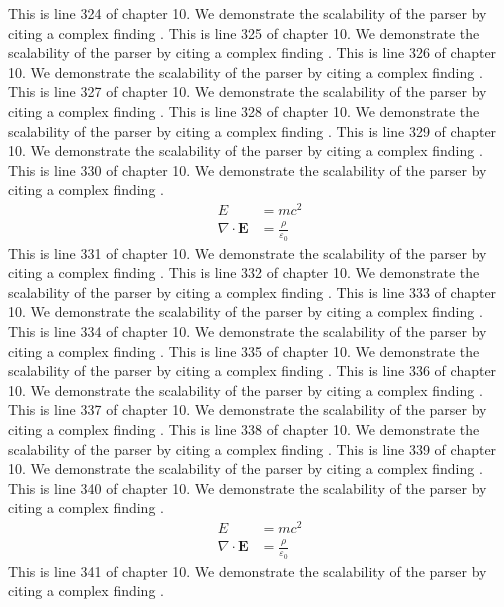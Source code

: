 This is line 324 of chapter 10. We demonstrate the scalability of the parser by citing a complex finding \cite{ref10_324}.
This is line 325 of chapter 10. We demonstrate the scalability of the parser by citing a complex finding \cite{ref10_325}.
This is line 326 of chapter 10. We demonstrate the scalability of the parser by citing a complex finding \cite{ref10_326}.
This is line 327 of chapter 10. We demonstrate the scalability of the parser by citing a complex finding \cite{ref10_327}.
This is line 328 of chapter 10. We demonstrate the scalability of the parser by citing a complex finding \cite{ref10_328}.
This is line 329 of chapter 10. We demonstrate the scalability of the parser by citing a complex finding \cite{ref10_329}.
This is line 330 of chapter 10. We demonstrate the scalability of the parser by citing a complex finding \cite{ref10_330}.
\begin{align*}
  E &= mc^2 \\
  \nabla \cdot \mathbf{E} &= \frac{\rho}{\varepsilon_0}
\end{align*}
This is line 331 of chapter 10. We demonstrate the scalability of the parser by citing a complex finding \cite{ref10_331}.
This is line 332 of chapter 10. We demonstrate the scalability of the parser by citing a complex finding \cite{ref10_332}.
This is line 333 of chapter 10. We demonstrate the scalability of the parser by citing a complex finding \cite{ref10_333}.
This is line 334 of chapter 10. We demonstrate the scalability of the parser by citing a complex finding \cite{ref10_334}.
This is line 335 of chapter 10. We demonstrate the scalability of the parser by citing a complex finding \cite{ref10_335}.
This is line 336 of chapter 10. We demonstrate the scalability of the parser by citing a complex finding \cite{ref10_336}.
This is line 337 of chapter 10. We demonstrate the scalability of the parser by citing a complex finding \cite{ref10_337}.
This is line 338 of chapter 10. We demonstrate the scalability of the parser by citing a complex finding \cite{ref10_338}.
This is line 339 of chapter 10. We demonstrate the scalability of the parser by citing a complex finding \cite{ref10_339}.
This is line 340 of chapter 10. We demonstrate the scalability of the parser by citing a complex finding \cite{ref10_340}.
\begin{align*}
  E &= mc^2 \\
  \nabla \cdot \mathbf{E} &= \frac{\rho}{\varepsilon_0}
\end{align*}
This is line 341 of chapter 10. We demonstrate the scalability of the parser by citing a complex finding \cite{ref10_341}.
